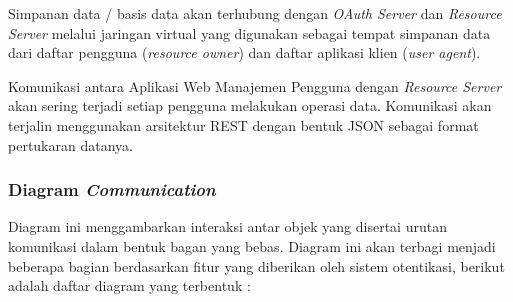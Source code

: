 \documentclass[pdftex,12pt, oneside]{article}
\begin{document}
Simpanan data / basis data akan terhubung dengan \textit{OAuth Server} dan \textit{Resource Server} melalui jaringan virtual yang digunakan sebagai tempat simpanan data dari daftar pengguna (\textit{resource owner}) dan daftar aplikasi klien (\textit{user agent}).

Komunikasi antara Aplikasi Web Manajemen Pengguna dengan \textit{Resource Server} akan sering terjadi setiap pengguna melakukan operasi data. Komunikasi akan terjalin menggunakan arsitektur REST dengan bentuk JSON sebagai format pertukaran datanya.

\subsubsection{Diagram \textit{Communication}}

Diagram ini menggambarkan interaksi antar objek yang disertai urutan komunikasi dalam bentuk bagan yang bebas. Diagram ini akan terbagi menjadi beberapa bagian berdasarkan fitur yang diberikan oleh sistem otentikasi, berikut adalah daftar diagram yang terbentuk :
\end{document}
